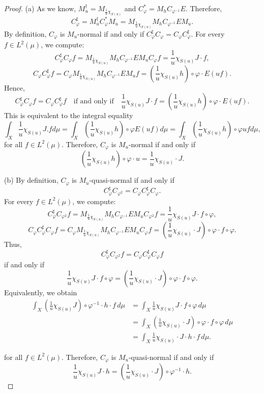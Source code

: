 \documentclass[10pt,a4paper]{amsart}
\begin{document}
\begin{proof}
(a) As we know, \( M_u^\dagger = M_{\frac{1}{u} \chi_{S(u)}} \) and \( C_\varphi^* = M_h C_{\varphi^{-1}} E \). Therefore,
\[
C_\varphi^\sharp = M_u^\dagger C_\varphi^* M_u = M_{\frac{1}{u} \chi_{S(u)}} M_h C_{\varphi^{-1}} E M_u.
\]
By definition, \( C_\varphi \) is \( M_u \)-normal if and only if \( C_\varphi^\sharp C_\varphi = C_\varphi C_\varphi^\sharp \). For every \( f \in L^2(\mu) \), we compute:
\[
C_\varphi^\sharp C_\varphi f = M_{\frac{1}{u} \chi_{S(u)}} M_h C_{\varphi^{-1}} E M_u C_\varphi f = \frac{1}{u} \chi_{S(u)} J \cdot f,
\]
\[
C_\varphi C_\varphi^\sharp f = C_\varphi M_{\frac{1}{u} \chi_{S(u)}} M_h C_{\varphi^{-1}} E M_u f = \left( \frac{1}{u} \chi_{S(u)} h \right) \circ \varphi \cdot E(uf).
\]
Hence,
\[
C_\varphi^\sharp C_\varphi f = C_\varphi C_\varphi^\sharp f \quad \text{if and only if} \quad \frac{1}{u} \chi_{S(u)} J \cdot f = \left( \frac{1}{u} \chi_{S(u)} h \right) \circ \varphi \cdot E(uf).
\]
This is equivalent to the integral equality
$$\int_X\frac{1}{u}\chi_{S(u)}J.fd\mu=\int_X(\frac{1}{u}\chi_{S(u)}h)\circ\varphi E(uf)d\mu=\int_X(\frac{1}{u}\chi_{S(u)}h)\circ\varphi ufd\mu,$$
for all \( f \in L^2(\mu) \). Therefore, \( C_\varphi \) is \( M_u \)-normal if and only if
\[
\left( \frac{1}{u} \chi_{S(u)} h \right) \circ \varphi \cdot u = \frac{1}{u} \chi_{S(u)} \cdot J.
\]

\medskip

(b) By definition, \( C_\varphi \) is \( M_u \)-quasi-normal if and only if
\[
C_\varphi^\sharp C_{\varphi^2} = C_\varphi C_\varphi^\sharp C_\varphi.
\]
For every \( f \in L^2(\mu) \), we compute:
\[
C_\varphi^\sharp C_{\varphi^2} f = M_{\frac{1}{u} \chi_{S(u)}} M_h C_{\varphi^{-1}} E M_u C_{\varphi^2} f = \frac{1}{u} \chi_{S(u)} J \cdot f \circ \varphi,
\]
\[
C_\varphi C_\varphi^\sharp C_\varphi f = C_\varphi M_{\frac{1}{u} \chi_{S(u)}} M_h C_{\varphi^{-1}} E M_u C_\varphi f = \left( \frac{1}{u} \chi_{S(u)} \cdot J \right) \circ \varphi \cdot f \circ \varphi.
\]
Thus,
\[
C_\varphi^\sharp C_{\varphi^2} f = C_\varphi C_\varphi^\sharp C_\varphi f
\]
if and only if
\[
\frac{1}{u} \chi_{S(u)} J \cdot f \circ \varphi = \left( \frac{1}{u} \chi_{S(u)} \cdot J \right) \circ \varphi \cdot f \circ \varphi.
\]
Equivalently, we obtain
\begin{align*}
\int_X \left( \frac{1}{u} \chi_{S(u)} J \right) \circ \varphi^{-1} \cdot h \cdot f \, d\mu 
&= \int_X \frac{1}{u} \chi_{S(u)} J \cdot f \circ \varphi \, d\mu \\
&= \int_X \left( \frac{1}{u} \chi_{S(u)} \cdot J \right) \circ \varphi \cdot f \circ \varphi \, d\mu \\
&= \int_X \frac{1}{u} \chi_{S(u)} \cdot J \cdot h \cdot f \, d\mu.
\end{align*}

for all \( f \in L^2(\mu) \). Therefore, \( C_\varphi \) is \( M_u \)-quasi-normal if and only if
\[
\frac{1}{u} \chi_{S(u)} J \cdot h = \left( \frac{1}{u} \chi_{S(u)} \cdot J \right) \circ \varphi^{-1} \cdot h.
\]
\end{proof}
\end{document}
